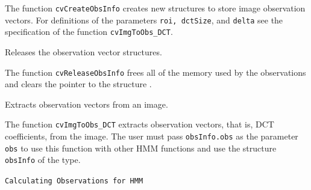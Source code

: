 The function \texttt{cvCreateObsInfo} creates new structures to store image observation vectors. For definitions of the parameters \texttt{roi, dctSize}, and \texttt{delta} see the specification of the function \texttt{cvImgToObs\_DCT}.


Releases the observation vector structures.


\begin{description}
\end{description}

The function \texttt{cvReleaseObsInfo} frees all of the memory used by the observations and clears the pointer to the structure .


Extracts observation vectors from an image.


\begin{description}
\end{description}

The function \texttt{cvImgToObs\_DCT} extracts observation vectors, that is, DCT coefficients, from the image. The user must pass \texttt{obsInfo.obs} as the parameter \texttt{obs} to use this function with other HMM functions and use the structure \texttt{obsInfo} of the  type.


\texttt{Calculating Observations for HMM}

